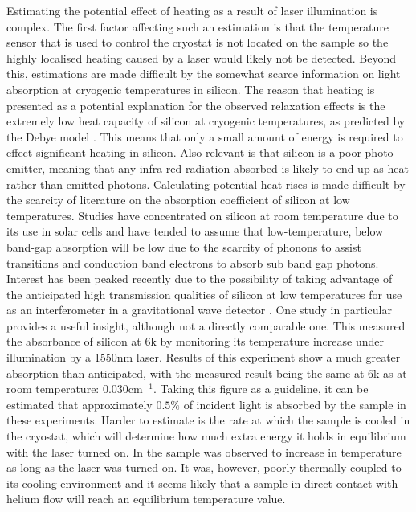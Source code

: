 Estimating the potential effect of heating as a result of laser illumination is complex.
The first factor affecting such an estimation is that the temperature sensor that is used to control the cryostat is not located on the sample so the highly localised heating caused by a laser would likely not be detected.
Beyond this, estimations are made difficult by the somewhat scarce information on light absorption at cryogenic temperatures in silicon.
The reason that heating is presented as a potential explanation for the observed relaxation effects is the extremely low heat capacity of silicon at cryogenic temperatures, as predicted by the Debye model \cite{ANDP:ANDP19123441404}.
This means that only a small amount of energy is required to effect significant heating in silicon.
Also relevant is that silicon is a poor photo-emitter, meaning that any infra-red radiation absorbed is likely to end up as heat rather than emitted photons. 
Calculating potential heat rises is made difficult by the scarcity of literature on the absorption coefficient of silicon at low temperatures.
Studies have concentrated on silicon at room temperature due to its use in solar cells and have tended to assume that low-temperature, below band-gap absorption will be low due to the scarcity of phonons to assist transitions and conduction band electrons to absorb sub band gap photons.
Interest has been peaked recently due to the possibility of taking advantage of the anticipated high transmission qualities of silicon at low temperatures for use as an interferometer in a gravitational wave detector \cite{Degallaix2014}.
One study in particular provides a useful insight, although not a directly comparable one.
This measured the absorbance of silicon at 6k by monitoring its temperature increase under illumination by a 1550nm laser.
Results of this experiment show a much greater absorption than anticipated, with the measured result being the same at 6k as at room temperature: 0.030cm$^{-1}$.
Taking this figure as a guideline, it can be estimated that approximately $0.5\%$ of incident light is absorbed by the sample in these experiments.
Harder to estimate is the rate at which the sample is cooled in the cryostat, which will determine how much extra energy it holds in equilibrium with the laser turned on.
In \cite{Degallaix2014} the sample was observed to increase in temperature as long as the laser was turned on.
It was, however, poorly thermally coupled to its cooling environment and it seems likely that a sample in direct contact with helium flow will reach an equilibrium temperature value.
